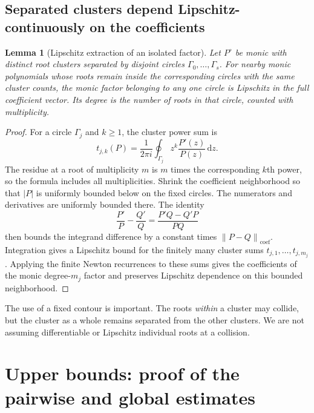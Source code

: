 \documentclass[11pt,a4paper]{article}
\numberwithin{equation}{section}
\newtheorem{lemma}[lemma]{Lemma}
\theoremstyle{definition}
\theoremstyle{remark}
\newcommand{\dd}{\,\mathrm d}
\newcommand{\norm}[1]{\left\lVert#1\right\rVert}
\newcommand{\coef}{\operatorname{coef}}
\begin{document}
\subsection{Separated clusters depend Lipschitz-continuously on the coefficients}
\begin{lemma}[Lipschitz extraction of an isolated factor]
\label{lem:cluster}
Let $P^{\circ}$ be monic with distinct root clusters separated by disjoint
circles $\Gamma_0,\ldots,\Gamma_s$.  For nearby monic polynomials whose roots
remain inside the corresponding circles with the same cluster counts, the
monic factor belonging to any one circle is Lipschitz in the full coefficient
vector.  Its degree is the number of roots in that circle, counted with
multiplicity.
\end{lemma}
\begin{proof}
For a circle $\Gamma_j$ and $k\ge1$, the cluster power sum is
\begin{equation}
 t_{j,k}(P)=\frac1{2\pi i}\oint_{\Gamma_j}z^k\frac{P'(z)}{P(z)}\dd z.
 \label{eq:cluster-integral}
\end{equation}
The residue at a root of multiplicity $m$ is $m$ times the corresponding $k$th
power, so the formula includes all multiplicities.  Shrink the coefficient
neighborhood so that $|P|$ is uniformly bounded below on the fixed circles.
The numerators and derivatives are uniformly bounded there.  The identity
\[
 \frac{P'}P-\frac{Q'}Q=\frac{P'Q-Q'P}{PQ}
\]
then bounds the integrand difference by a constant times
$\norm{P-Q}_{\coef}$.  Integration gives a Lipschitz bound for the finitely many
cluster sums $t_{j,1},\ldots,t_{j,m_j}$.  Applying the finite Newton recurrences
to these sums gives the coefficients of the monic degree-$m_j$ factor and
preserves Lipschitz dependence on this bounded neighborhood.
\end{proof}
The use of a fixed contour is important.  The roots \emph{within} a cluster may
collide, but the cluster as a whole remains separated from the other clusters.
We are not assuming differentiable or Lipschitz individual roots at a collision.

\section{Upper bounds: proof of the pairwise and global estimates}
\label{sec:upper}
\end{document}
